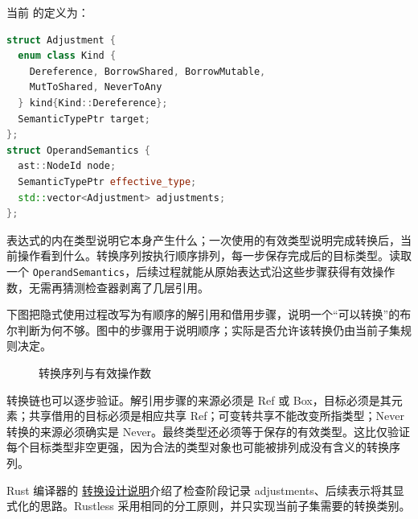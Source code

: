 当前  的定义为：
\begin{lstlisting}[language=C++]
struct Adjustment {
  enum class Kind {
    Dereference, BorrowShared, BorrowMutable,
    MutToShared, NeverToAny
  } kind{Kind::Dereference};
  SemanticTypePtr target;
};
struct OperandSemantics {
  ast::NodeId node;
  SemanticTypePtr effective_type;
  std::vector<Adjustment> adjustments;
};
\end{lstlisting}
表达式的内在类型说明它本身产生什么；一次使用的有效类型说明完成转换后，当前操作看到什么。转换序列按执行顺序排列，每一步保存完成后的目标类型。读取一个 \texttt{OperandSemantics}，后续过程就能从原始表达式沿这些步骤获得有效操作数，无需再猜测检查器剥离了几层引用。

下图把隐式使用过程改写为有顺序的解引用和借用步骤，说明一个“可以转换”的布尔判断为何不够。图中的步骤用于说明顺序；实际是否允许该转换仍由当前子集规则决定。
\begin{figure}[htbp]
\centering
{}
\caption{转换序列与有效操作数}
\end{figure}

转换链也可以逐步验证。解引用步骤的来源必须是 Ref 或 Box，目标必须是其元素；共享借用的目标必须是相应共享 Ref；可变转共享不能改变所指类型；Never 转换的来源必须确实是 Never。最终类型还必须等于保存的有效类型。这比仅验证每个目标类型非空更强，因为合法的类型对象也可能被排列成没有含义的转换序列。

Rust 编译器的 \href{https://rustc-dev-guide.rust-lang.org/hir-typeck/coercions.html}{转换设计说明}介绍了检查阶段记录 adjustments、后续表示将其显式化的思路。Rustless 采用相同的分工原则，并只实现当前子集需要的转换类别。

